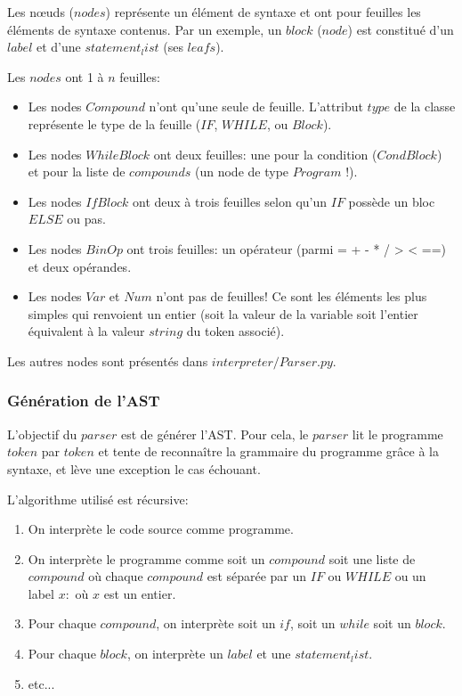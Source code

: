 \documentclass[a4paper]{article}
\begin{document}
Les nœuds ($nodes$) représente un élément de syntaxe et ont pour feuilles les éléments de syntaxe contenus. Par un exemple, un $block$ ($node$) est constitué d'un $label$ et d'une $statement_list$ (ses $leafs$). 

Les $nodes$ ont 1 à $n$ feuilles:
\begin{itemize}
\item Les nodes $Compound$ n'ont qu'une seule de feuille. L'attribut $type$ de la classe représente le type de la feuille ($IF$, $WHILE$, ou $Block$). 
\item Les nodes $WhileBlock$ ont deux feuilles: une pour la condition ($CondBlock$) et pour la liste de $compounds$ (un node de type $Program$ !).
\item Les nodes $IfBlock$ ont deux à trois feuilles selon qu'un $IF$ possède un bloc $ELSE$ ou pas. 
\item Les nodes $BinOp$ ont trois feuilles: un opérateur (parmi = + - * / > < ==) et deux opérandes. 
\item Les nodes $Var$ et $Num$ n'ont pas de feuilles! Ce sont les éléments les plus simples qui renvoient un entier (soit la valeur de la variable soit l'entier équivalent à la valeur $string$ du token associé). 
\end{itemize}

Les autres nodes sont présentés dans $interpreter/Parser.py$. 

\subsubsection{Génération de l'AST}

L'objectif du $parser$ est de générer l'AST. Pour cela, le $parser$ lit le programme $token$ par $token$ et tente de reconnaître la grammaire du programme grâce à la syntaxe, et lève une exception le cas échouant. 

L'algorithme utilisé est récursive: 
\begin{enumerate}
\item On interprète le code source comme programme.
\item On interprète le programme comme soit un $compound$ soit une liste de $compound$ où chaque $compound$ est séparée par un $IF$ ou $WHILE$ ou un label $x:$ où $x$ est un entier. 
\item Pour chaque $compound$, on interprète soit un $if$, soit un $while$ soit un $block$.
\item Pour chaque $block$, on interprète un $label$ et une $statement_list$.
\item etc...
\end{enumerate}
\end{document}
